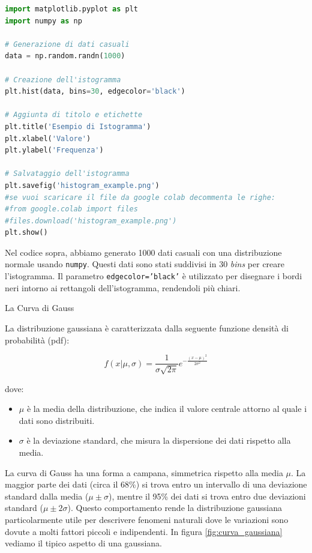 \documentclass[12pt,a4paper,oneside]{book}
\makeatletter
\renewcommand{\subsection}{\@startsection {subsection}{2}{\z@}
{-3ex \@plus -0.1ex \@minus -.4ex}
{0.5ex \@plus.2ex }
{\color[rgb]{0.141,0.596,0.749}\normalfont\sffamily\bfseries}}
\theoremstyle{esercizio}
\makeatother
\begin{document}
\begin{lstlisting}[language=Python, caption=Codice Python per generare un istogramma, label=code:histogram]
import matplotlib.pyplot as plt
import numpy as np

# Generazione di dati casuali
data = np.random.randn(1000)

# Creazione dell'istogramma
plt.hist(data, bins=30, edgecolor='black')

# Aggiunta di titolo e etichette
plt.title('Esempio di Istogramma')
plt.xlabel('Valore')
plt.ylabel('Frequenza')

# Salvataggio dell'istogramma
plt.savefig('histogram_example.png')
#se vuoi scaricare il file da google colab decommenta le righe:
#from google.colab import files
#files.download('histogram_example.png')
plt.show()
\end{lstlisting}

Nel codice sopra, abbiamo generato 1000 dati casuali con una distribuzione normale usando \texttt{numpy}. Questi dati sono stati suddivisi in 30 \textit{bins} per creare l'istogramma. Il parametro \texttt{edgecolor='black'} è utilizzato per disegnare i bordi neri intorno ai rettangoli dell'istogramma, rendendoli più chiari.






\subsection{La Curva di Gauss}

La distribuzione gaussiana è caratterizzata dalla seguente funzione densità di probabilità (pdf):

\begin{equation}
f(x|\mu,\sigma) = \frac{1}{\sigma \sqrt{2\pi}} e^{-\frac{(x-\mu)^2}{2\sigma^2}}
\end{equation}

dove:
\begin{itemize}
    \item $\mu$ è la media della distribuzione, che indica il valore centrale attorno al quale i dati sono distribuiti.
    \item $\sigma$ è la deviazione standard, che misura la dispersione dei dati rispetto alla media.
\end{itemize}

La curva di Gauss ha una forma a campana, simmetrica rispetto alla media $\mu$. La maggior parte dei dati (circa il 68\%) si trova entro un intervallo di una deviazione standard dalla media ($\mu \pm \sigma$), mentre il 95\% dei dati si trova entro due deviazioni standard ($\mu \pm 2\sigma$). Questo comportamento rende la distribuzione gaussiana particolarmente utile per descrivere fenomeni naturali dove le variazioni sono dovute a molti fattori piccoli e indipendenti. In figura \ref{fig:curva_gaussiana} vediamo il tipico aspetto di una gaussiana.
\end{document}
